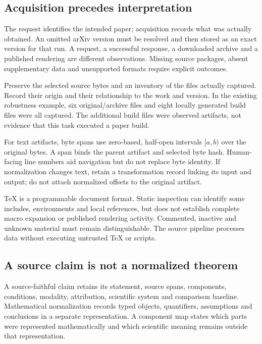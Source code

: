 \subsection{Acquisition precedes interpretation}

The request identifies the intended paper; acquisition records what was actually obtained. An omitted arXiv version must be resolved and then stored as an exact version for that run. A request, a successful response, a downloaded archive and a published rendering are different observations. Missing source packages, absent supplementary data and unsupported formats require explicit outcomes.

 Preserve the selected source bytes and an inventory of the files actually captured. Record their origin and their relationship to the work and version. In the existing robustness example, six original/archive files and eight locally generated build files were all captured. The additional build files were observed artifacts, not evidence that this task executed a paper build.

 For text artifacts, byte spans use zero-based, half-open intervals $[a,b)$ over the original bytes. A span binds the parent artifact and selected byte hash. Human-facing line numbers aid navigation but do not replace byte identity. If normalization changes text, retain a transformation record linking its input and output; do not attach normalized offsets to the original artifact.

 TeX is a programmable document format. Static inspection can identify some includes, environments and local references, but does not establish complete macro expansion or published rendering activity. Commented, inactive and unknown material must remain distinguishable. The source pipeline processes data without executing untrusted TeX or scripts.

\subsection{A source claim is not a normalized theorem}

A source-faithful claim retains its statement, source spans, components, conditions, modality, attribution, scientific system and comparison baseline. Mathematical normalization records typed objects, quantifiers, assumptions and conclusions in a separate representation. A component map states which parts were represented mathematically and which scientific meaning remains outside that representation.

